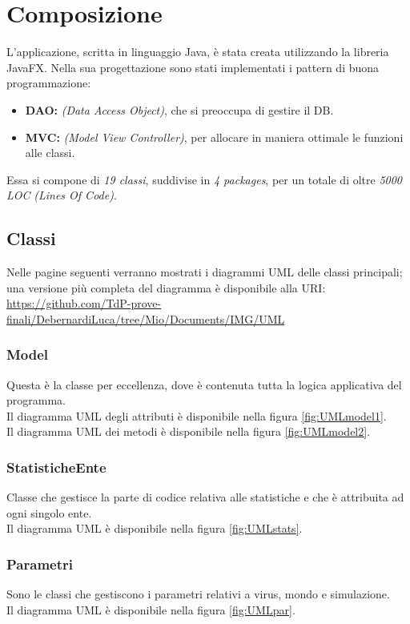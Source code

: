 \documentclass[a4paper, 12pt]{article}
\begin{document}
		
\newpage
		
\section{Composizione}
	L'applicazione, scritta in linguaggio Java, è stata creata utilizzando la libreria JavaFX.
	Nella sua progettazione sono stati implementati i pattern di buona programmazione:
	\begin{itemize}
		\item \textbf{DAO:} \emph{(Data Access Object)}, che si preoccupa di gestire il DB.
		\item \textbf{MVC:} \emph{(Model View Controller)}, per allocare in maniera ottimale le funzioni alle classi.
	\end{itemize}
	Essa si compone di \emph{19 classi}, suddivise in \emph{4 packages}, per un totale di oltre \emph{5000 LOC} \emph{(Lines Of Code)}.
	
	\subsection{Classi}
		Nelle pagine seguenti verranno mostrati i diagrammi UML delle classi principali; una versione più completa del diagramma è disponibile alla URI: \url{https://github.com/TdP-prove-finali/DebernardiLuca/tree/Mio/Documents/IMG/UML}
	
	\subsubsection{Model}
		Questa è la classe per eccellenza, dove è contenuta tutta la logica applicativa del programma.\\
		Il diagramma UML degli attributi è disponibile nella figura  \vref{fig:UMLmodel1}.\\
		Il diagramma UML dei metodi è disponibile nella figura  \vref{fig:UMLmodel2}.
		
	\subsubsection{StatisticheEnte}
		Classe che gestisce la parte di codice relativa alle statistiche e che è attribuita ad ogni singolo ente.\\
		Il diagramma UML è disponibile nella figura  \vref{fig:UMLstats}.
	
	\subsubsection{Parametri}
		Sono le classi che gestiscono i parametri relativi a virus, mondo e simulazione.\\
		Il diagramma UML è disponibile nella figura  \vref{fig:UMLpar}.
		
\end{document}
